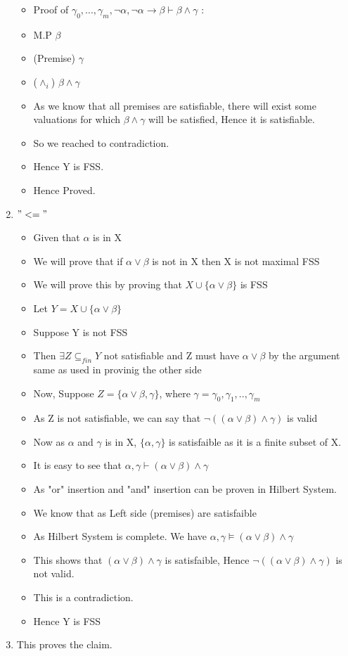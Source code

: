 \documentclass[12pt]{scrartcl}
\begin{document}
\begin{enumerate}
\begin{itemize}
    \item Proof of $\gamma_{0},...,\gamma_{m},\neg \alpha,\neg \alpha \rightarrow \beta \vdash \beta \wedge \gamma$ :
    \item M.P $\beta$
    \item (Premise) $\gamma$
    \item ($\wedge_{i}$) $\beta \wedge \gamma$
    \item As we know that all premises are satisfiable, there will exist some valuations for which $\beta \wedge \gamma$ will be satisfied, Hence it is satisfiable.
    \item So we reached to contradiction.
    \item Hence Y is FSS.
    \item Hence Proved.
    \end{itemize}
    \item $"<="$
    \begin{itemize}
        \item Given that $\alpha$ is in X
        \item We will prove that if $\alpha \vee \beta$ is not in X then X is not maximal FSS
        \item We will prove this by proving that $X \cup \{\alpha \vee \beta\}$ is FSS
        \item Let $Y = X \cup \{\alpha \vee \beta\}$
        \item Suppose Y is not FSS
        \item Then $\exists Z \subseteq_{fin} Y$ not satisfiable and Z must have $\alpha \vee \beta$ by the argument same as used in provinig the other side
        \item Now, Suppose $Z = \{\alpha \vee \beta, \gamma\}$, where $\gamma = \gamma_{0},\gamma_{1},..,\gamma_{m}$
        \item As Z is not satisfiable, we can say that $\neg((\alpha \vee \beta) \wedge \gamma)$ is valid
        \item Now as $\alpha$ and $\gamma$ is in X, $\{\alpha,\gamma\}$ is satisfaible as it is a finite subset of X.
        \item It is easy to see that $\alpha,\gamma \vdash (\alpha \vee \beta) \wedge \gamma$
        \item As "or" insertion and "and" insertion can be proven in Hilbert System.
        \item We know that as Left side (premises) are satisfaible
        \item As Hilbert System is complete. We have $\alpha,\gamma \models (\alpha \vee \beta) \wedge \gamma$
        \item This shows that $(\alpha \vee \beta) \wedge \gamma$ is satisfaible, Hence $\neg((\alpha \vee \beta) \wedge \gamma)$ is not valid.
        \item This is a contradiction.
        \item Hence Y is FSS
    \end{itemize}
    \item This proves the claim.
\end{enumerate}
\end{document}
